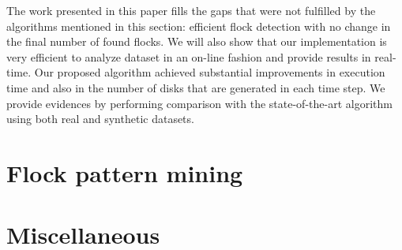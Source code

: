 The work presented in this paper fills the gaps that were not fulfilled by the algorithms mentioned in this section:
efficient flock detection with no change in the final number of found flocks. We will also show that our implementation
is very efficient to analyze dataset in an on-line fashion and provide results in real-time. Our proposed algorithm
achieved substantial improvements in execution time and also in the number of disks that are generated in each time
step. We provide evidences by performing comparison with the state-of-the-art algorithm using both real and synthetic
datasets.

\section{Flock pattern mining}
\label{sec:rel_flock}

\section{Miscellaneous}
\label{sec:rel_miscellaneous}
